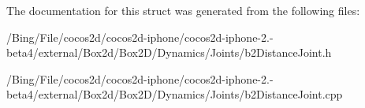 The documentation for this struct was generated from the following files\-:\begin{DoxyCompactItemize}
\item 
/\-Bing/\-File/cocos2d/cocos2d-\/iphone/cocos2d-\/iphone-\/2.-\/beta4/external/\-Box2d/\-Box2\-D/\-Dynamics/\-Joints/b2\-Distance\-Joint.\-h\item 
/\-Bing/\-File/cocos2d/cocos2d-\/iphone/cocos2d-\/iphone-\/2.-\/beta4/external/\-Box2d/\-Box2\-D/\-Dynamics/\-Joints/b2\-Distance\-Joint.\-cpp\end{DoxyCompactItemize}
